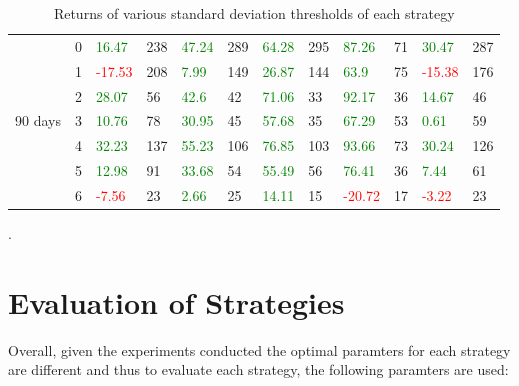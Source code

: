 \begin{table}[!htb]
\begin{adjustwidth}{-0.8in}{-0.9in}
\begin{tabular}{|p{4em}|p{2em}|p{3em}|p{3em}|p{3em}|p{3em}|p{3em}|p{3em}|p{3em}|p{3em}|p{3em}|p{3em}|}
            & 0 & \textcolor{green}{16.47} & 238 & \textcolor{green}{47.24} & 289 & \textcolor{green}{64.28} & 295 & \textcolor{green}{87.26} & 71 & \textcolor{green}{30.47} & 287\\\cline{3-12}
            & 1 & \textcolor{red}{-17.53} & 208 & \textcolor{green}{7.99} & 149 & \textcolor{green}{26.87} & 144 & \textcolor{green}{63.9} & 75 & \textcolor{red}{-15.38} & 176\\\cline{3-12}
            & 2 & \textcolor{green}{28.07} & 56 & \textcolor{green}{42.6} & 42 & \textcolor{green}{71.06} & 33 & \textcolor{green}{92.17} & 36 & \textcolor{green}{14.67} & 46\\\cline{3-12}
            90 days & 3 & \textcolor{green}{10.76} & 78 & \textcolor{green}{30.95} & 45 & \textcolor{green}{57.68} & 35 & \textcolor{green}{67.29} & 53 & \textcolor{green}{0.61} & 59\\\cline{3-12}
            & 4 & \textcolor{green}{32.23} & 137 & \textcolor{green}{55.23} & 106 & \textcolor{green}{76.85} & 103 & \textcolor{green}{93.66} & 73 & \textcolor{green}{30.24} & 126\\\cline{3-12}
            & 5 & \textcolor{green}{12.98} & 91 & \textcolor{green}{33.68} & 54 & \textcolor{green}{55.49} & 56 & \textcolor{green}{76.41} & 36 & \textcolor{green}{7.44} & 61\\\cline{3-12}
            & 6 & \textcolor{red}{-7.56} & 23 & \textcolor{green}{2.66} & 25 & \textcolor{green}{14.11} & 15 & \textcolor{red}{-20.72} & 17 & \textcolor{red}{-3.22} & 23\\\hline
            
        \end{tabular}
    \end{adjustwidth}
    \caption{Returns of various standard deviation thresholds of each strategy \label{tab:VaryWS}}.
\end{table}

\section{Evaluation of Strategies}
Overall, given the experiments conducted the optimal paramters for each strategy are different and thus to evaluate each strategy, the following paramters are used:

